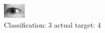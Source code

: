 \begin{figure}[h!]
\begin{center}
\includegraphics[width=0.60\columnwidth]{figures/ID3264_class_3_target_4.png}
\end{center}
\caption{ Classification: 3 actual target: 4}
\label{fig:ID3264_class_3_target_4}
\end{figure}
